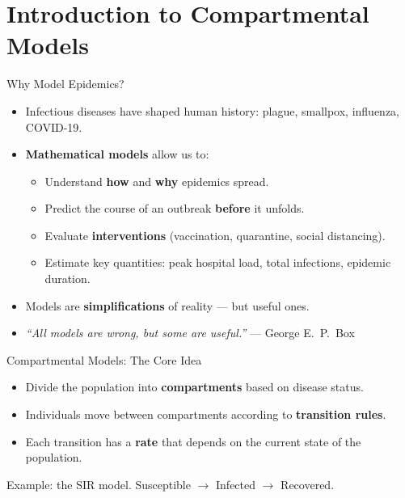 \section{Introduction to Compartmental Models}

\begin{frame}{Why Model Epidemics?}
  \begin{itemize}
    \item Infectious diseases have shaped human history: plague, smallpox, influenza, COVID-19.
    \vfill
    \pause
    \item \textbf{Mathematical models} allow us to:
      \begin{itemize}
        \item Understand \textbf{how} and \textbf{why} epidemics spread.
        \item Predict the course of an outbreak \textbf{before} it unfolds.
        \item Evaluate \textbf{interventions} (vaccination, quarantine, social distancing).
        \item Estimate key quantities: peak hospital load, total infections, epidemic duration.
      \end{itemize}
    \pause
      \vfill
    \item Models are \textbf{simplifications} of reality --- but useful ones.
    \item \textit{``All models are wrong, but some are useful.''} --- George E.\ P.\ Box
  \end{itemize}
\end{frame}

\begin{frame}{Compartmental Models: The Core Idea}
  \begin{itemize}
    \item Divide the population into \textbf{compartments} based on disease status.
    \item Individuals move between compartments according to \textbf{transition rules}.
    \item Each transition has a \textbf{rate} that depends on the current state of the population.
  \end{itemize}
  \vfill
  \begin{center}
  \end{center}
  \vfill
  \small
  Example: the SIR model. Susceptible $\to$ Infected $\to$ Recovered.
\end{frame}

